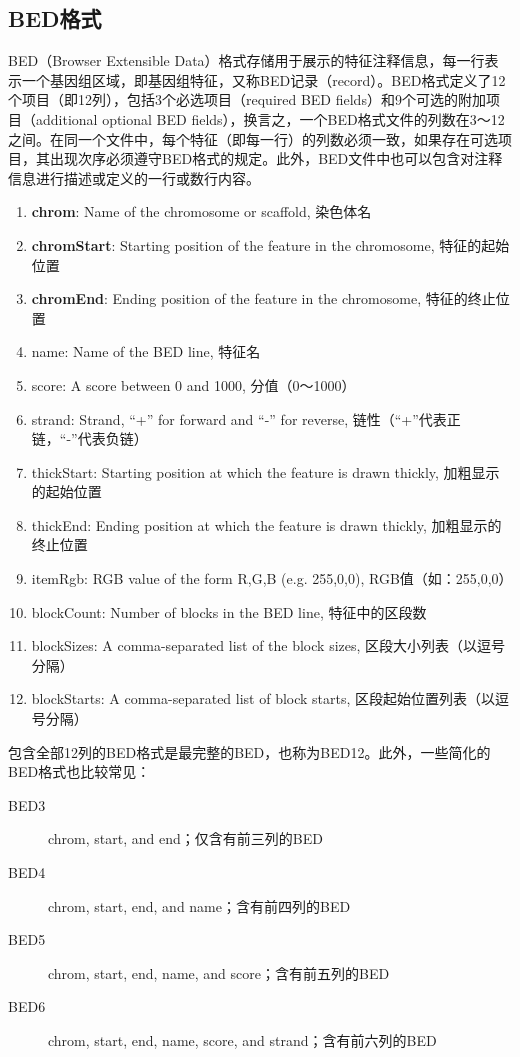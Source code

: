 \documentclass[11pt,a4paper,twoside]{book}
\begin{document}
\subsection{BED格式}
BED（Browser Extensible Data）格式存储用于展示的特征注释信息，每一行表示一个基因组区域，即基因组特征，又称BED记录（record）。BED格式定义了12个项目（即12列），包括3个必选项目（required BED fields）和9个可选的附加项目（additional optional BED fields），换言之，一个BED格式文件的列数在3～12之间。在同一个文件中，每个特征（即每一行）的列数必须一致，如果存在可选项目，其出现次序必须遵守BED格式的规定。此外，BED文件中也可以包含对注释信息进行描述或定义的一行或数行内容。
\begin{enumerate}
  \item \textbf{chrom}: Name of the chromosome or scaffold, 染色体名
  \item \textbf{chromStart}: Starting position of the feature in the chromosome, 特征的起始位置
  \item \textbf{chromEnd}: Ending position of the feature in the chromosome, 特征的终止位置
  \item name: Name of the BED line, 特征名
  \item score: A score between 0 and 1000, 分值（0～1000）
  \item strand: Strand, ``+'' for forward and ``-'' for reverse, 链性（“+”代表正链，“-”代表负链）
  \item thickStart: Starting position at which the feature is drawn thickly, 加粗显示的起始位置
  \item thickEnd: Ending position at which the feature is drawn thickly, 加粗显示的终止位置
  \item itemRgb: RGB value of the form R,G,B (e.g. 255,0,0), RGB值（如：255,0,0）
  \item blockCount: Number of blocks in the BED line, 特征中的区段数
  \item blockSizes: A comma-separated list of the block sizes, 区段大小列表（以逗号分隔）
  \item blockStarts: A comma-separated list of block starts, 区段起始位置列表（以逗号分隔）
\end{enumerate}

包含全部12列的BED格式是最完整的BED，也称为BED12。此外，一些简化的BED格式也比较常见：
\begin{description}
  \item[BED3] chrom, start, and end；仅含有前三列的BED
  \item[BED4] chrom, start, end, and name；含有前四列的BED
  \item[BED5] chrom, start, end, name, and score；含有前五列的BED
  \item[BED6] chrom, start, end, name, score, and strand；含有前六列的BED
\end{description}
\end{document}
